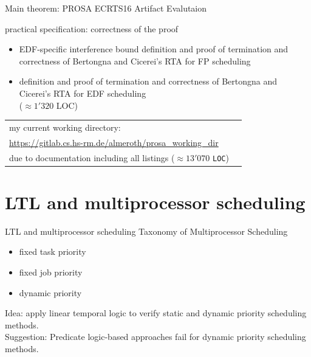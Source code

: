 \documentclass{beamer}
\begin{document}
		  
%	
%	           
	\begin{frame}{Main theorem: PROSA ECRTS16 Artifact Evalutaion}
     
	 practical specification: correctness of the proof 
	 		   
		 \begin{itemize}
	 	\item EDF-specific interference bound definition and proof of termination and correctness  of Bertongna and Cicerei's RTA for FP scheduling
		\item \alert{definition} \alert{and} \alert{proof} \alert{of} \alert{termination} \alert{and} \alert{correctness} \alert{of} \alert{Bertongna} \alert{and} \alert{Cicerei's} \alert{RTA} \alert{for} \alert{EDF} \alert{scheduling} \\($\approx 1'320$ LOC)    	   
		\end{itemize} 
			
	
    
    \begin{table}[]
			\begin{tabularx}{\linewidth}{l>{\raggedright}X}	
			my current working directory:\tabularnewline
			\url{https://gitlab.cs.hs-rm.de/almeroth/prosa_working_dir}\tabularnewline
			due to documentation including all listings
			($\approx 13'070$ \texttt{LOC})		
			\end{tabularx}
			\label{tab:Prosa_working_Dir}
			 
		\end{table}			 	
	
 	\end{frame}
			
	\section{LTL and multiprocessor scheduling}
	
	\begin{frame}{LTL and multiprocessor scheduling}
		Taxonomy of Multiprocessor Scheduling
		\begin{itemize}
			\item fixed task priority
			\item fixed job priority
			\item dynamic priority	
		\end{itemize}
	
	Idea: apply linear temporal logic to verify static and dynamic priority scheduling methods.\\
	Suggestion: Predicate logic-based approaches fail for dynamic priority scheduling methods. 	
	\end{frame}
	
\end{document}
